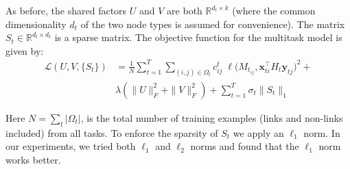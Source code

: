 \documentclass{bioinfo}
\begin{document}
As before, the shared factors $U$ and $V$ are both $\mathbb{R}^{d_t \times k}$ (where the common dimensionality $d_t$ of the two node types is assumed for convenience). The matrix $S_t \in \mathbb{R}^{d_t \times d_t}$ is a sparse matrix. The objective function for the multitask model is given by:
\begin{equation}
\label{mtl_objective}
\begin{array}{ll}
\mathcal{L}(U,V,\{S_t\}) & = \displaystyle{ \frac{1}{N} \sum_{t=1}^T \sum_{(i,j) \in \Omega_t}} c^t_{ij} \; \ell \big( M_{t_{ij}}, \mathbf{x}_{ti}^\intercal H_t \mathbf{y}_{tj} \big)^2 + \\
& \lambda ( \|U\|^2_F + \|V\|^2_F ) + \displaystyle{\sum_{t=1}^T \sigma_t \|S_t\|_1} 
\end{array}
\end{equation}

Here $N = \sum_t | \Omega_t |$, is the total number of training examples (links and non-links included) from all tasks. To enforce the sparsity of $S_t$ we apply an $\ell_1$ norm. In our experiments, we tried both $\ell_1$ and $\ell_2$ norms and found that the $\ell_1$ norm works better.


%
\end{document}
